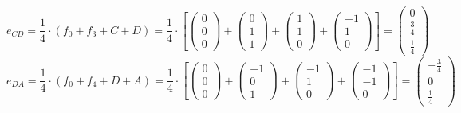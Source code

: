 \documentclass{article}
\begin{document}
\[e_{CD}=\frac{1}{4}\cdot(f_0+f_3+C+D)=\frac{1}{4}\cdot\left[
\left({\begin{array}{c} 0 \\  0 \\ 0 \end{array}}\right)+
\left({\begin{array}{c} 0 \\ 1 \\ 1 \end{array}}\right)+
\left({\begin{array}{c} 1 \\ 1 \\ 0 \end{array}}\right)+
\left({\begin{array}{c} -1 \\  1 \\ 0 \end{array}}\right)\right]=
\left({\begin{array}{c}  0 \\ \frac{3}{4} \\ \frac{1}{4} \end{array}}\right)
\]
\[e_{DA}=\frac{1}{4}\cdot(f_0+f_4+D+A)=\frac{1}{4}\cdot\left[
\left({\begin{array}{c} 0 \\  0 \\ 0 \end{array}}\right)+
\left({\begin{array}{c} -1 \\ 0 \\ 1 \end{array}}\right)+
\left({\begin{array}{c} -1 \\ 1 \\ 0 \end{array}}\right)+
\left({\begin{array}{c} -1 \\  -1 \\ 0 \end{array}}\right)\right]=
\left({\begin{array}{c}  -\frac{3}{4} \\ 0 \\ \frac{1}{4} \end{array}}\right)
\]
\end{document}
